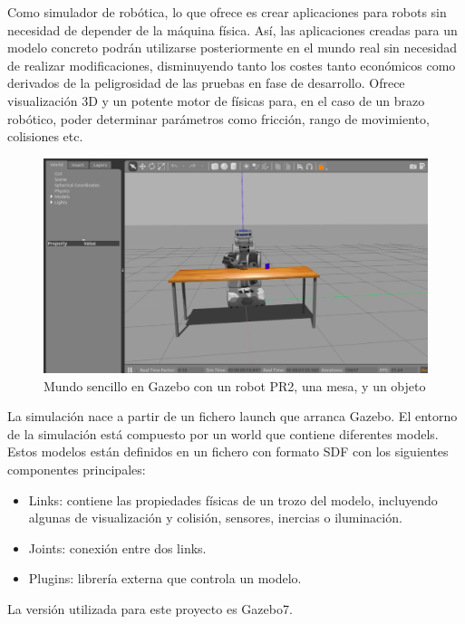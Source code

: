 \documentclass[12pt,spanish,chapterprefix, numbers=noenddot]{book}
\numberwithin{equation}{section}
\numberwithin{figure}{section}
\begin{document}
Como simulador de robótica, lo que ofrece es crear aplicaciones para robots sin necesidad de depender de la máquina física. Así, las aplicaciones creadas para un modelo concreto podrán utilizarse posteriormente en el mundo real sin necesidad de realizar modificaciones, disminuyendo tanto los costes tanto económicos como derivados de la peligrosidad de las pruebas en fase de desarrollo.
Ofrece visualización 3D y un potente motor de físicas para, en el caso de un brazo robótico, poder determinar parámetros como fricción, rango de movimiento, colisiones etc.
\begin{figure}[hbt!]
\centering
\includegraphics[width=12cm]{Figs/GazeboWorld_PR2.png}
\par
\caption{\label{fig:gazeboExample}Mundo sencillo en Gazebo con un robot PR2, una mesa, y un objeto}
\end{figure}
La simulación nace a partir de un fichero launch que arranca Gazebo. El entorno de la simulación está compuesto por un world que contiene diferentes models. Estos modelos están definidos en un fichero con formato SDF con los siguientes componentes principales:
\begin{itemize}
\item Links: contiene las propiedades físicas de un trozo del modelo, incluyendo algunas de visualización y colisión, sensores, inercias o iluminación.
\item Joints: conexión entre dos links.
\item Plugins: librería externa que controla un modelo. 
\end{itemize}
La versión utilizada para este proyecto es Gazebo7.
\end{document}
